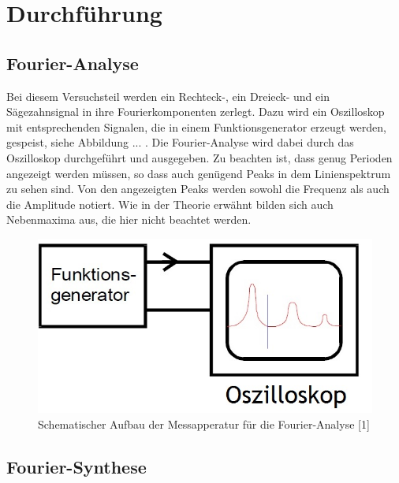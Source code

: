 \section{Durchführung}
\label{sec:Durchführung}

\subsection{Fourier-Analyse}

Bei diesem Versuchsteil werden ein Rechteck-, ein Dreieck- und 
ein Sägezahnsignal in ihre Fourierkomponenten zerlegt. Dazu wird
ein Oszilloskop mit entsprechenden Signalen, die in einem Funktionsgenerator 
erzeugt werden, gespeist, siehe Abbildung ... . 
Die Fourier-Analyse wird dabei durch das
Oszilloskop durchgeführt und ausgegeben. Zu beachten ist, dass genug
Perioden angezeigt werden müssen, so dass auch genügend Peaks in dem 
Linienspektrum zu sehen sind. Von den angezeigten Peaks werden sowohl
die Frequenz als auch die Amplitude notiert. Wie in der Theorie erwähnt
bilden sich auch Nebenmaxima aus, die hier nicht beachtet werden. 

\begin{figure}
  \centering
  \includegraphics[scale=0.2]{content/Aufbau_1.jpg}
  \caption{Schematischer Aufbau der Messapperatur für die Fourier-Analyse [1]}
  \label{fig:aufbau}
\end{figure}

\subsection{Fourier-Synthese}


